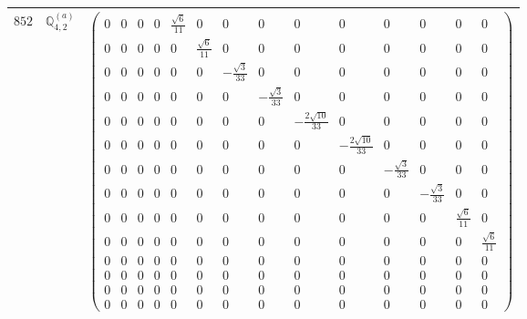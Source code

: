 \documentclass[fleqn,8pt,landscape]{jsarticle}
\begin{document}
\begin{center}
\begin{longtable}{ccc}
$ 852 $ & $ \mathbb{Q}_{4,2}^{(a)} $ & $ \begin{pmatrix} 0 & 0 & 0 & 0 & \frac{\sqrt{6}}{11} & 0 & 0 & 0 & 0 & 0 & 0 & 0 & 0 & 0 \\ 0 & 0 & 0 & 0 & 0 & \frac{\sqrt{6}}{11} & 0 & 0 & 0 & 0 & 0 & 0 & 0 & 0 \\ 0 & 0 & 0 & 0 & 0 & 0 & - \frac{\sqrt{3}}{33} & 0 & 0 & 0 & 0 & 0 & 0 & 0 \\ 0 & 0 & 0 & 0 & 0 & 0 & 0 & - \frac{\sqrt{3}}{33} & 0 & 0 & 0 & 0 & 0 & 0 \\ 0 & 0 & 0 & 0 & 0 & 0 & 0 & 0 & - \frac{2 \sqrt{10}}{33} & 0 & 0 & 0 & 0 & 0 \\ 0 & 0 & 0 & 0 & 0 & 0 & 0 & 0 & 0 & - \frac{2 \sqrt{10}}{33} & 0 & 0 & 0 & 0 \\ 0 & 0 & 0 & 0 & 0 & 0 & 0 & 0 & 0 & 0 & - \frac{\sqrt{3}}{33} & 0 & 0 & 0 \\ 0 & 0 & 0 & 0 & 0 & 0 & 0 & 0 & 0 & 0 & 0 & - \frac{\sqrt{3}}{33} & 0 & 0 \\ 0 & 0 & 0 & 0 & 0 & 0 & 0 & 0 & 0 & 0 & 0 & 0 & \frac{\sqrt{6}}{11} & 0 \\ 0 & 0 & 0 & 0 & 0 & 0 & 0 & 0 & 0 & 0 & 0 & 0 & 0 & \frac{\sqrt{6}}{11} \\ 0 & 0 & 0 & 0 & 0 & 0 & 0 & 0 & 0 & 0 & 0 & 0 & 0 & 0 \\ 0 & 0 & 0 & 0 & 0 & 0 & 0 & 0 & 0 & 0 & 0 & 0 & 0 & 0 \\ 0 & 0 & 0 & 0 & 0 & 0 & 0 & 0 & 0 & 0 & 0 & 0 & 0 & 0 \\ 0 & 0 & 0 & 0 & 0 & 0 & 0 & 0 & 0 & 0 & 0 & 0 & 0 & 0 \end{pmatrix} $ \\ \hline

\end{longtable}
\end{center}
\end{document}

